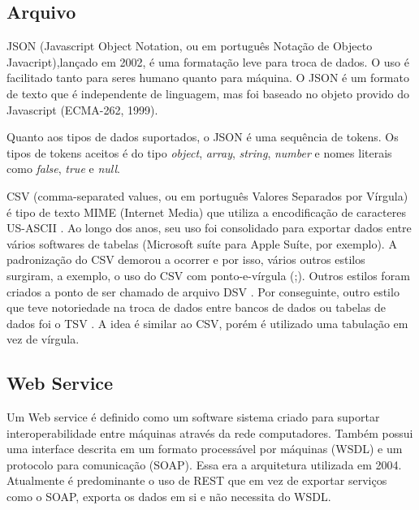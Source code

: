 \documentclass[
	12pt,				%
	openright,			%
	twoside,			%
	a4paper,			%
	english,			%
	brazil				%
	]{abntex2}
\begin{document}
		\subsection{Arquivo}
		JSON \cite{json-rfc-8259} \cite{json-jsonOrg} (Javascript Object Notation, ou em português Notação de Objecto Javacript),lançado em 2002, é uma formatação leve para troca de dados. 
		O uso é facilitado tanto para seres humano quanto para máquina.
		O JSON é um formato de texto que é independente de linguagem, mas foi baseado no objeto provido do Javascript (ECMA-262, 1999).
		\par
		Quanto aos tipos de dados suportados, o JSON \cite{json-rfc-8259} é uma sequência de tokens. 
		Os tipos de tokens aceitos é do tipo \textit{object}, \textit{array}, \textit{string}, \textit{number} e nomes literais como \textit{false}, \textit{true} e \textit{null}.
		\par
		CSV \cite{csv-rfc-4180} (comma-separated values, ou em português Valores Separados por Vírgula) é tipo de texto MIME (Internet Media) \cite{mime-rfc-2048} que utiliza a encodificação de caracteres US-ASCII \cite{csv-rfc-7111}.
		Ao longo dos anos, seu uso foi consolidado para exportar dados entre vários softwares de tabelas (Microsoft suíte para Apple Suíte, por exemplo).
		A padronização do CSV demorou a ocorrer e por isso, vários outros estilos surgiram, a exemplo, o uso do CSV com ponto-e-vírgula (;).
		Outros estilos foram criados a ponto de ser chamado de arquivo DSV \cite{dsv}.
		Por conseguinte, outro estilo que teve notoriedade na troca de dados entre bancos de dados ou tabelas de dados foi o TSV \cite{tsv-iana}.
		A idea é similar ao CSV, porém é utilizado uma tabulação em vez de vírgula.
		
		\subsection{Web Service}
		\cite{webService-W3C}
		Um Web service é definido como um software sistema criado para suportar interoperabilidade entre máquinas através da rede computadores. Também possui uma interface descrita em um formato processável por máquinas (WSDL) e um protocolo para comunicação (SOAP). \cite{webService-W3C}
		Essa era a arquitetura utilizada em 2004. Atualmente é predominante o uso de REST que em vez de exportar serviços como o SOAP, exporta os dados em si e não necessita do WSDL. \cite{soapVSrest}
		
\end{document}
